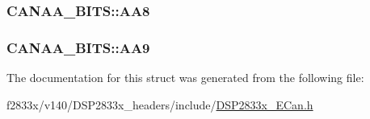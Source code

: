 \subsubsection[{A\+A8}]{ C\+A\+N\+A\+A\+\_\+\+B\+I\+T\+S\+::\+A\+A8}\label{struct_c_a_n_a_a___b_i_t_s_ac5a84eb1b515f4533a9b7e7a76347010}
\hypertarget{struct_c_a_n_a_a___b_i_t_s_ad05ad1d74472c07afb4accd38dae4f81}{}
\subsubsection[{A\+A9}]{ C\+A\+N\+A\+A\+\_\+\+B\+I\+T\+S\+::\+A\+A9}\label{struct_c_a_n_a_a___b_i_t_s_ad05ad1d74472c07afb4accd38dae4f81}


The documentation for this struct was generated from the following file\+:\begin{DoxyCompactItemize}
\item 
f2833x/v140/\+D\+S\+P2833x\+\_\+headers/include/\hyperlink{_d_s_p2833x___e_can_8h}{D\+S\+P2833x\+\_\+\+E\+Can.\+h}\end{DoxyCompactItemize}
